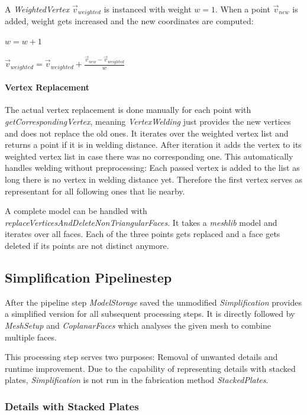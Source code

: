 \documentclass[../ClassicThesis.tex]{subfiles}
\begin{document}
A \emph{WeightedVertex} $\vec{v}_{weighted}$ is instanced with weight $w = 1$. When a point $\vec{v}_{new}$ is added, weight gets increased and the new coordinates are computed:

$ w = w + 1 $

$ \vec{v}_{weighted} = \vec{v}_{weighted} + \frac{\vec{v}_{new} - \vec{v}_{weighted}}{w}$


\paragraph{Vertex Replacement}

The actual vertex replacement is done manually for each point with \emph{getCorrespondingVertex}, meaning \emph{VertexWelding} just provides the new vertices and does not replace the old ones. It iterates over the weighted vertex list and returns a point if it is in welding distance. After iteration it adds the vertex to its weighted vertex list in case there was no corresponding one. This automatically handles welding without preprocessing: Each passed vertex is added to the list as long there is no vertex in welding distance yet. Therefore the first vertex serves as representant for all following ones that lie nearby.

A complete model can be handled with \emph{replaceVerticesAndDeleteNonTriangularFaces}. It takes a \emph{meshlib} model and iterates over all faces. Each of the three points gets replaced and a face gets deleted if its points are not distinct anymore.




\subsection{Simplification Pipelinestep}

After the pipeline step \emph{ModelStorage} saved the unmodified {\threedmodel} \emph{Simplification} provides a simplified version for all subsequent processing steps. It is directly followed by \emph{MeshSetup} and \emph{CoplanarFaces} which analyses the given mesh to combine multiple faces.

This processing step serves two purposes: Removal of unwanted details and runtime improvement. Due to the capability of representing details with stacked plates, \emph{Simplification} is not run in the fabrication method \emph{StackedPlates}.

\subsubsection{Details with Stacked Plates}
\end{document}
